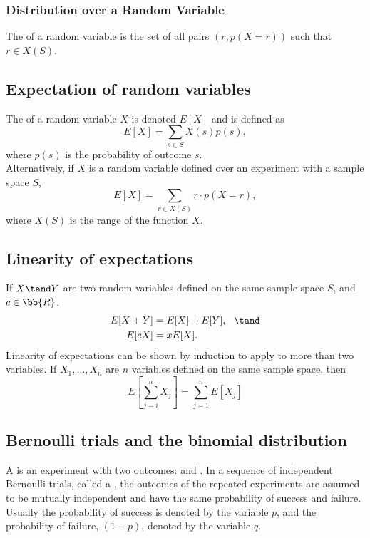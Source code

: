 \subsubsection*{Distribution over a Random Variable}
The  of a random variable is the set of all pairs $(r,p(X=r))$ such that $r \in X(S)$.

\subsection{Expectation of random variables}
The  of a random variable $X$ is denoted $E[X]$ and is defined as
\[
  E[X] = \sum_{s \in S} X(s)p(s),
\]
where $p(s)$ is the probability of outcome $s$. \\
\newline
Alternatively, if $X$ is a random variable defined over an experiment with a sample space $S$,
\[
  E[X] = \sum_{r \in X(S)} r \cdot p(X = r),
\]
where $X(S)$ is the range of the function $X$.

\subsection{Linearity of expectations}
If $X \tand Y$ are two random variables defined on the same sample space $S$, and $c \in \bb{R}$,
\begin{align*}
  E[X+Y] & = E[X] + E[Y],~~\tand \\
  E[cX]  & = xE[X].
\end{align*}
Linearity of expectations can be shown by induction to apply to more than two variables. If $X_1,\ldots,X_n$ are $n$ variables defined on the same sample space, then
\[
  E\left[\sum_{j=i}^{n} X_j\right] = \sum_{j=1}^{n} E[X_j]
\]

\subsection{Bernoulli trials and the binomial distribution}
A  is an experiment with two outcomes:  and . In a sequence of independent Bernoulli trials, called a , the outcomes of the repeated experiments are assumed to be mutually independent and have the same probability of success and failure. Usually the probability of success is denoted by the variable $p$, and the probability of failure, $(1-p)$, denoted by the variable $q$.

